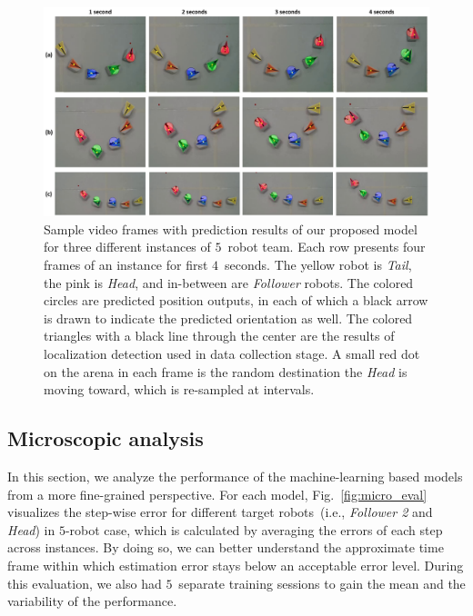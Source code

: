 \documentclass[letterpaper, 10 pt, conference]{ieeeconf}  %
\begin{document}
	\begin{figure}[t]
		\centering
		\includegraphics[width=2.\columnwidth]{fig_preds}
		\caption{Sample video frames with prediction results of our proposed model
			for three different instances of $5$~robot team.
			Each row presents four frames of an instance for first $4$~seconds.
			The yellow robot is \emph{Tail}, the pink is \emph{Head}, and
			in-between are \emph{Follower} robots.
			The colored circles are predicted position outputs, in each
			of which a black arrow is drawn to indicate the predicted orientation as well.
			The colored triangles with a black line through the center are the
			results of localization detection used in data collection stage.
			A small red dot on the arena in each frame is the random destination the
			\emph{Head} is moving toward, which is re-sampled at intervals.
		}
		\label{fig:preds}
	\end{figure}
	\subsection{Microscopic analysis}
	\label{sec:microscopic_analysis}

    In this section, we analyze the performance of the machine-learning
    based models from a more fine-grained perspective. For each model,
    Fig.~\ref{fig:micro_eval} visualizes the step-wise error for
    different target robots~(i.e., \emph{Follower 2} and \emph{Head}) in
    $5$-robot case, which is calculated by averaging the errors of each
    step across instances. By doing so, we can better understand the
    approximate time frame within which estimation error stays below an
    acceptable error level. During this evaluation, we also had
    $5$~separate training sessions to gain the mean and the variability
    of the performance.
\end{document}

